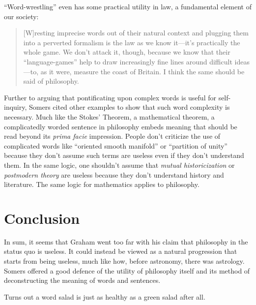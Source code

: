 \documentclass[12pt]{article}
\begin{document}
\enquote{Word-wrestling} even has some practical utility in law, a fundamental element of our society:

\begin{quotation}
 [W]resting imprecise words out of their natural context and plugging them into a perverted formalism is the law as we know it—it’s practically the whole game. We don’t attack it, though, because we know that their “language-games” help to draw increasingly fine lines around difficult ideas—to, as it were, measure the coast of Britain. I think the same should be said of philosophy.
\end{quotation}

Further to arguing that pontificating upon complex words is useful for self-inquiry, Somers cited other examples to show that such word complexity is necessary. Much like the Stokes' Theorem, a mathematical theorem, a complicatedly worded sentence in philosophy embeds meaning that should be read beyond its \emph{prima facie} impression. People don't criticize the use of complicated words like \enquote{oriented smooth manifold} or \enquote{partition of unity} because they don't assume such terms are useless even if they don't understand them. In the same logic, one shouldn't assume that \emph{mutual historicization} or \emph{postmodern theory} are useless because they don't understand history and literature. The same logic for mathematics applies to philosophy.

\section{Conclusion}

In sum, it seems that Graham went too far with his claim that philosophy in the status quo is useless. It could instead be viewed as a natural progression that starts from being useless, much like how, before astronomy, there was astrology. Somers offered a good defence of the utility of philosophy itself and its method of deconstructing the meaning of words and sentences.

Turns out a word salad is just as healthy as a green salad after all.

\end{document}

